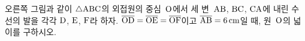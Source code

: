\noindent\begin{minipage}[t]{0.58\linewidth}\vspace{0pt}\raggedright 오른쪽 그림과 같이 $\triangle\mathrm{ABC}$의 외접원의 중심~$\mathrm{O}$에서 세 변~$\mathrm{AB}$, $\mathrm{BC}$, $\mathrm{CA}$에 내린 수선의 발을 각각 $\mathrm{D}$, $\mathrm{E}$, $\mathrm{F}$라 하자. $\overline{\mathrm{OD}}=\overline{\mathrm{OE}}=\overline{\mathrm{OF}}$이고 $\overline{\mathrm{AB}}=6\,\mathrm{cm}$일 때, 원~$\mathrm{O}$의 넓이를 구하시오.\end{minipage}\hfill\begin{minipage}[t]{0.4\linewidth}\vspace{0pt}\centering \resizebox{\ifdim\width>\linewidth\linewidth\else\width\fi}{!}{}\end{minipage}\par
